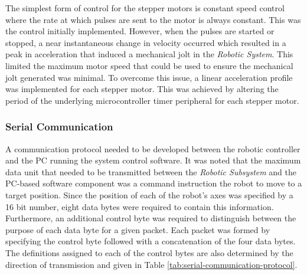 The simplest form of control for the stepper motors is constant speed control where the rate at which pulses are sent to the motor is always constant. This was the control initially implemented. However, when the pulses are started or stopped, a near instantaneous change in velocity occurred which resulted in a peak in acceleration that induced a mechanical jolt in the \textit{Robotic System}. This limited the maximum motor speed that could be used to ensure the mechanical jolt generated was minimal. To overcome this issue, a linear acceleration profile was implemented for each stepper motor. This was achieved by altering the period of the underlying microcontroller timer peripheral for each stepper motor.

\subsubsection{Serial Communication} \label{sec:Serial Communication}

A communication protocol needed to be developed between the robotic controller and the PC running the system control software. It was noted that the maximum data unit that needed to be transmitted between the \textit{Robotic Subsystem} and the PC-based software component was a command instruction the robot to move to a target position. Since the position of each of the robot's axes was specified by a 16 bit number, eight data bytes were required to contain this information. Furthermore, an additional control byte was required to distinguish between the purpose of each data byte for a given packet. Each packet was formed by specifying the control byte followed with a concatenation of the four data bytes. The definitions assigned to each of the control bytes are also determined by the direction of transmission and given in Table \ref{tab:serial-communication-protocol}.

